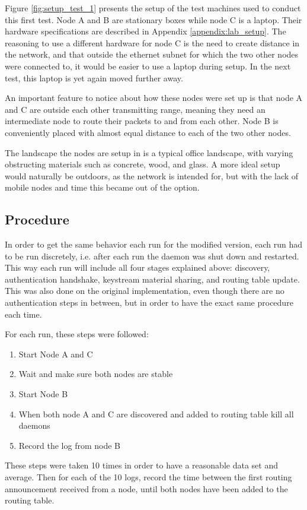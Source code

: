 Figure \ref{fig:setup_test_1} presents the setup of the test machines used to
conduct this first test. Node A and B are stationary boxes while node C is a
laptop. Their hardware specifications are described in Appendix
\ref{appendix:lab_setup}. The reasoning to use a different hardware for node C
is the need to create distance in the network, and that outside the ethernet
subnet for which the two other nodes were connected to, it would be easier to
use a laptop during setup. In the next test, this laptop is yet again moved
further away.

An important feature to notice about how these nodes were set up is that node A
and C are outside each other transmitting range, meaning they need an
intermediate node to route their packets to and from each other. Node B is
conveniently placed with almost equal distance to each of the two other nodes.

The landscape the nodes are setup in is a typical office landscape, with varying
obstructing materials such as concrete, wood, and glass. A more ideal setup
would naturally be outdoors, as the network is intended for, but with the lack
of mobile nodes and time this became out of the option.

\subsection{Procedure}
In order to get the same behavior each run for the modified version, each run
had to be run discretely, i.e. after each run the daemon was shut down and
restarted. This way each run will include all four stages explained above:
discovery, authentication handshake, keystream material sharing, and routing
table update. This was also done on the original implementation, even though
there are no authentication steps in between, but in order to have the exact
same procedure each time.

For each run, these steps were followed:
\begin{enumerate}
  \item Start Node A and C
  \item Wait and make sure both nodes are stable
  \item Start Node B
  \item When both node A and C are discovered and added to routing table kill
  all daemons
  \item Record the log from node B
\end{enumerate}
These steps were taken 10 times in order to have a reasonable data set and
average. Then for each of the 10 logs, record the time between the first routing
announcement received from a node, until both nodes have been added to the
routing table.

